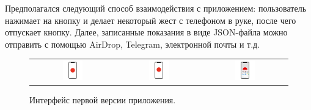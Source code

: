 Предполагался следующий способ взаимодействия с приложением: пользователь нажимает на кнопку и делает некоторый жест с телефоном в руке, после чего отпускает кнопку. Далее, записанные показания в виде JSON-файла можно отправить с помощью AirDrop, Telegram, электронной почты и т.д.
\begin{figure}[H]
    \begin{center}
        \begin{tabular}{ccc}
            \includegraphics[width=0.25\textwidth]{max_kt1_images/image2.png} & 
            \includegraphics[width=0.25\textwidth]{max_kt1_images/image3.png} & 
            \includegraphics[width=0.25\textwidth]{max_kt1_images/image1.png} \\
        \end{tabular}
    \end{center}
    \caption{Интерфейс первой версии приложения.}
\end{figure}


